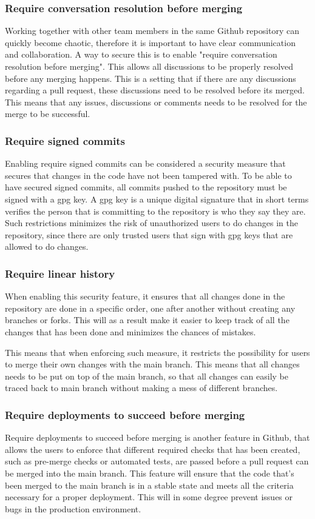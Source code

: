 \subsubsection{Require conversation resolution before merging}
Working together with other team members in the same Github repository can quickly become chaotic, therefore it is important to have clear communication and collaboration. A way to secure this is to enable "require conversation resolution before merging". This allows all discussions to be properly resolved before any merging happens. This is a setting that if there are any discussions regarding a pull request, these discussions need to be resolved before its merged. This means that any issues, discussions or comments needs to be resolved for the merge to be successful. 
\\
\subsubsection{Require signed commits}
Enabling require signed commits can be considered a security measure that secures that changes in the code have not been tampered with. 
To be able to have secured signed commits, all commits pushed to the repository must be signed with a \acrlong{gpg} key. A \acrshort{gpg} key is  a unique digital signature that in short terms verifies the person that is committing to the repository is who they say they are. 
Such restrictions minimizes the risk of unauthorized users to do changes in the repository, since there are only trusted users that sign with \acrshort{gpg} keys that are allowed to do changes. 

\subsubsection{Require linear history}
When enabling this security feature, it ensures that all changes done in the repository are done in a specific order, one after another without creating any branches or forks. This will as a result make it easier to keep track of all the changes that has been done and minimizes the chances of mistakes. 

This means that when enforcing such measure, it restricts the possibility for users to merge their own changes with the main branch. This means that all changes needs to be put on top of the main branch, so that all changes can easily be traced back to main branch without making a mess of different branches. 
\newpage

\subsubsection{Require deployments to succeed before merging}
Require deployments to succeed before merging is another feature in Github, that allows the users to enforce that different required checks that has been created, such as pre-merge checks or automated tests, are passed before a pull request can be merged into the main branch. This feature will ensure that the code that's been merged to the main branch is in a stable state and meets all the criteria necessary for a proper deployment. This will in some degree prevent issues or bugs in the production environment. 

